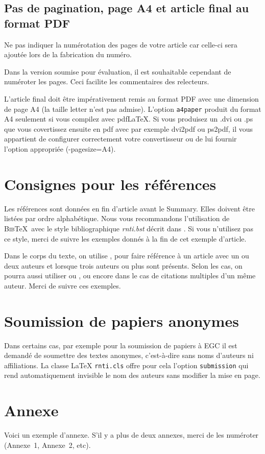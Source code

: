 \documentclass[a4paper,pagenum,french,showlayout]{rnti}
\begin{document}
\subsection{Pas de pagination, page A4 et article final au format PDF}

Ne pas indiquer la numérotation des pages de votre article car
celle-ci sera ajoutée lors de la fabrication du numéro.

Dans la version soumise pour évaluation, il est souhaitable
cependant de numéroter les pages. Ceci facilite les commentaires des
relecteurs.

L'article final doit être impérativement remis au format PDF avec
une dimension de page A4 (la taille letter n'est pas admise).
L'option \texttt{a4paper} produit du format A4 seulement si vous
compilez avec pdf\LaTeX{}. Si vous produisez un .dvi ou .ps que vous
covertissez ensuite en pdf avec par exemple dvi2pdf ou ps2pdf, il
vous appartient de configurer correctement votre convertisseur ou de
lui fournir l'option appropriée (-pagesize=A4).


\section{Consignes pour les références}

Les références sont données en fin d'article avant le
\guilo{}Summary\guilf{}. Elles doivent être listées par ordre
alphabétique.  Nous vous recommandons l'utilisation de
\textsc{Bib}\TeX\ avec le style bibliographique \textit{rnti.bst}
décrit dans \citet{ritschard:2005rnti}. Si vous n'utilisez pas ce
style, merci de suivre les exemples donnés à la fin de cet exemple
d'article.

Dans le corps du texte, on utilise \citet{thSau00}, \citet{HolWil90}
pour faire référence à un article avec un ou deux auteurs et
\citet{lioni01} lorsque trois auteurs ou plus sont présents.  Selon
les cas, on pourra aussi utiliser \citep{thSau00} ou
\citep[voir][chapitre 4]{brei:frie:olsh:ston:1984}, ou encore
\citet{quin:1986ID3,quin:1993} dans le cas de citations multiples
d'un même auteur. Merci de suivre ces exemples.

\section{Soumission de papiers anonymes}

Dans certains cas, par exemple pour la soumission de papiers à EGC il est demandé de soumettre des textes anonymes, c'est-à-dire sans noms d'auteurs ni affiliations. La classe \LaTeX{} \texttt{rnti.cls} offre pour cela l'option \texttt{submission} qui rend automatiquement invisible le nom des auteurs sans modifier la mise en page.




\appendix
\section*{Annexe}

Voici un exemple d'annexe. S'il y a plus de deux annexes, merci de
les numéroter (Annexe~1, Annexe~2, etc).

\Fr
\end{document}
